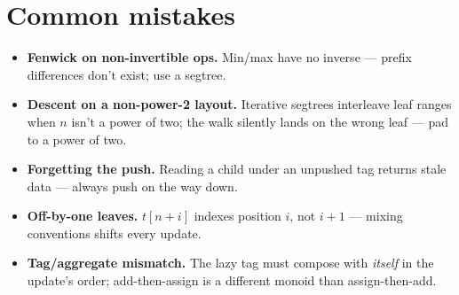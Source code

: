 \section{Common mistakes}
\begin{itemize}
\item \textbf{Fenwick on non-invertible ops.} Min/max have no
inverse --- prefix differences don't exist; use a segtree.
\item \textbf{Descent on a non-power-2 layout.} Iterative segtrees
interleave leaf ranges when $n$ isn't a power of two; the walk
silently lands on the wrong leaf --- pad to a power of two.
\item \textbf{Forgetting the push.} Reading a child under an
unpushed tag returns stale data --- always push on the way down.
\item \textbf{Off-by-one leaves.} $t[n+i]$ indexes position $i$,
not $i{+}1$ --- mixing conventions shifts every update.
\item \textbf{Tag/aggregate mismatch.} The lazy tag must compose
with \emph{itself} in the update's order; add-then-assign is a
different monoid than assign-then-add.
\end{itemize}

